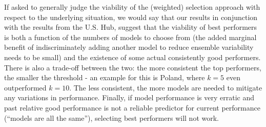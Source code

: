 If asked to generally judge the viability of the (weighted) selection approach with respect to the underlying situation, we would say that our results in conjunction with the results from the U.S. Hub, suggest that the viability of best performers is both a function of the numbers of models to choose from (the added marginal benefit of indiscriminately adding another model to reduce ensemble variability needs to be small) and the existence of some actual consistently good performers. There is also a trade-off between the two: the more consistent the top performers, the smaller the threshold - an example for this is Poland, where $k = 5$ even outperformed $k = 10$. The less consistent, the more models are needed to mitigate any variations in performance. Finally, if model performance is very erratic and past relative good performance is not a reliable predictor for current performance (``models are all the same''), selecting best performers will not work.\\
